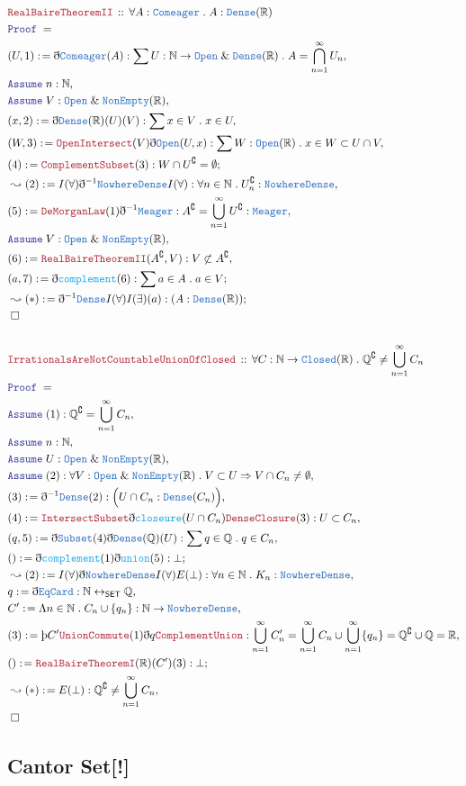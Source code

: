 \documentclass[12pt]{scrartcl}
\newcommand{\TYPE}[1]{\textcolor{NavyBlue}{\mathtt{#1}}}
\newcommand{\FUNC}[1]{\textcolor{Cerulean}{\mathtt{#1}}}
\newcommand{\LOGIC}[1]{\textcolor{Blue}{\mathtt{#1}}}
\newcommand{\THM}[1]{\textcolor{Maroon}{\mathtt{#1}}}
\renewcommand{\.}{\; . \;}
\newcommand{\de}{: \kern 0.1pc =}
\newcommand{\Theorem}[2]{& \THM{#1} \, :: \, #2 \\ & \Proof = \\ }
\newcommand{\Page}[1]{ \begin{align*} #1 \end{align*}   }
\newcommand{ \bd }{ \ByDef }
\renewcommand{\And}{\; \& \;}
\newcommand{\Reals}{\mathbb{R} }
\newcommand{\Rats}{\mathbb{Q} }
\newcommand{\Nat}{\mathbb{N} }
\newcommand{\ToBij}{\leftrightarrow}
\renewcommand{\c}{\complement}
\newcommand{\Say}[3]{& #1 \de #2 : #3, \\}
\newcommand{\Conclude}[3]{& #1 \de #2 : #3; \\}
\newcommand{\Derive}[3]{& \leadsto #1 \de #2 : #3, \\}
\newcommand{\DeriveConclude}[3]{& \leadsto #1 \de #2 : #3 ; \\}
\newcommand{\Assume}[2]{& \LOGIC{Assume} \;#1 : #2, \\}
\newcommand{\QED}{\; \square}
\newcommand{\EndProof}{& \QED \\}
\newcommand{\ByDef}{\eth}
\newcommand{\ByConstr}{\text{\thorn}}
\newcommand{\Proof}{\LOGIC{Proof} \; }
\newcommand{\SET}{\mathsf{SET}}
\newcommand{\ND}{\TYPE{NowhereDense}}
\begin{document}
\Page{
	\Theorem{RealBaireTheoremII}{ \forall A : \TYPE{Comeager} \. A : \TYPE{Dense}(\Reals)}
	\Say{(U,1)}{\bd \TYPE{Comeager}(A)}{ \sum U : \Nat \to \TYPE{Open} \And \TYPE{Dense}(\Reals) \.
		A = \bigcap^\infty_{n=1} U_n}
	\Assume{n}{\Nat}
	\Assume{V}{\TYPE{Open} \And \TYPE{NonEmpty}(\Reals)}
	\Say{(x,2)}{\bd \TYPE{Dense}(\Reals)(U)(V)}{ \sum x \in V \. x \in U  }
	\Say{(W,3)}{ \THM{OpenIntersect}(V) \bd \TYPE{Open}(U,x) }
	{\sum W : \TYPE{Open}(\Reals) \. x \in W \subset U \cap V   }
	\Conclude{(4)}{\THM{ComplementSubset}(3)}{ W \cap U^\c = \emptyset}
	\Derive{(2)}{I(\forall)\bd^{-1} \ND I(\forall)}
	{ \forall n \in \Nat \. U^\c_n : \ND   }
	\Say{(5)}{\THM{DeMorganLaw}(1)\bd^{-1} \TYPE{Meager}}{ A^\c = \bigcup^\infty_{n=1} U^\c : \TYPE{Meager}}
	\Assume{V}{\TYPE{Open} \And \TYPE{NonEmpty}(\Reals)}
	\Say{(6)}{\THM{RealBaireTheoremII}(A^\c , V)}{ V \not \subset A^\c }
	\Conclude{(a,7)}{\bd \FUNC{complement}(6)}{\sum a \in A \. a \in V}
	\DeriveConclude{(*)}{\bd^{-1} \TYPE{Dense} I(\forall) I(\exists)(a)}
	{(A : \TYPE{Dense}(\Reals))}
	\EndProof
	\\
	\Theorem{IrrationalsAreNotCountableUnionOfClosed}{
		\forall C : \Nat \to \TYPE{Closed}(\Reals) \.  \Rats^\c \neq \bigcup^\infty_{n=1} C_n
	}
	\Assume{(1)}{ \Rats^\c = \bigcup^\infty_{n = 1} C_n}
	\Assume{n}{\Nat}
	\Assume{U}{\TYPE{Open}\And \TYPE{NonEmpty}(\Reals)}
	\Assume{(2)}{\forall V : \TYPE{Open} \And \TYPE{NonEmpty}(\Reals) \. V \subset U \Rightarrow V \cap C_n \neq \emptyset}
	\Say{(3)}{\bd^{-1}\TYPE{Dense}(2)}
	{ 
		\Big( U \cap C_n : \TYPE{Dense}(C_n) \Big)                            
	}
	\Say{(4)}{\THM{IntersectSubset}\bd \FUNC{closeure}(U \cap C_n)\THM{DenseClosure}(3)}{  U \subset C_n  }
	\Say{(q,5)}{ \bd \TYPE{Subset}(4)\bd \TYPE{Dense}(\Rats)(U)  }{\sum q \in \Rats \. q \in C_n }
	\Conclude{()}{ \bd \FUNC{complement}(1)\bd \FUNC{union}(5) }{\bot}
	\Derive{(2)}{ I(\forall)\bd \ND I(\forall)E(\bot)}{\forall n \in \Nat \. K_n : \ND}
	\Say{q}{\bd \TYPE{EqCard}}{\Nat \ToBij_{\SET} \Rats}
	\Say{C'}{\Lambda n \in \Nat \. C_n \cup \{ q_n \} }{\Nat \to \ND}
	\Say{(3)}{\ByConstr C' \THM{UnionCommute} (1)\bd q \THM{ComplementUnion}}
	{\bigcup^\infty_{n=1} C'_n = \bigcup^\infty_{n=1} C_n \cup \bigcup^\infty_{n=1} \{q_n\} 
	 = \Rats^\c \cup \Rats = \Reals}
	 \Conclude{()}{\THM{RealBaireTheoremI}(\Reals)(C')(3)}{\bot}
	\Derive{(*)}{E(\bot)}{\Rats^\c \neq \bigcup^\infty_{n=1} C_n}
	\EndProof
}
\subsection{Cantor Set[!]}
\newpage
\end{document}
